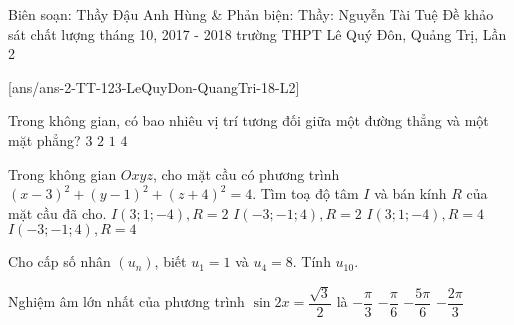 
\begin{name}
	{Biên soạn: Thầy Đậu Anh Hùng \& Phản biện: Thầy: Nguyễn Tài Tuệ}
	{Đề khảo sát chất lượng tháng 10, 2017 - 2018 trường THPT Lê Quý Đôn, Quảng Trị, Lần 2}
\end{name}
\setcounter{ex}{0}\setcounter{bt}{0}
[ans/ans-2-TT-123-LeQuyDon-QuangTri-18-L2]
\begin{ex}%
	Trong không gian, có bao nhiêu vị trí tương đối giữa một đường thẳng và một mặt phẳng?
	\choice
	{\True $3$}
	{$2$}
	{$1$}
	{$4$}

\end{ex}
\begin{ex}%
	Trong không gian $Oxyz$, cho mặt cầu có phương trình $(x-3)^2+(y-1)^2+(z+4)^2=4$. Tìm toạ độ tâm $I$ và bán kính $R$ của mặt cầu đã cho.
	\choice
	{\True $I(3;1;-4), R=2$}
	{$I(-3;-1;4), R=2$}
	{$I(3;1;-4), R=4$}
	{$I(-3;-1;4), R=4$}
\end{ex}
\begin{ex}%
	Cho cấp số nhân $(u_n)$, biết $u_1=1$ và $u_4=8$. Tính $u_{10}$.
\end{ex}

\begin{ex}%
	Nghiệm âm lớn nhất của phương trình $\sin 2x=\dfrac{\sqrt{3}}{2}$  là
	\choice
	{$-\dfrac{\pi}{3}$}
	{$-\dfrac{\pi}{6}$}
	{ $-\dfrac{5\pi}{6}$}
	{\True$-\dfrac{2\pi}{3}$}
\end{ex}

